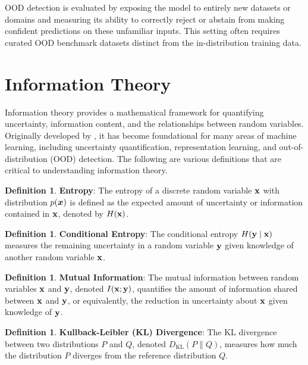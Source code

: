 \documentclass[11pt, oneside]{book}
\theoremstyle{plain}
\theoremstyle{definition}
\newtheorem{definition}[theorem]{Definition}
\theoremstyle{remark}
\begin{document}
OOD detection is evaluated by exposing the model to entirely new datasets or domains and measuring its ability to correctly reject or abstain from making confident predictions on these unfamiliar inputs. This setting often requires curated OOD benchmark datasets distinct from the in-distribution training data.

\section{Information Theory}

Information theory provides a mathematical framework for quantifying uncertainty, information content, and the relationships between random variables. Originally developed by \citet{shannon1948mathematical}, it has become foundational for many areas of machine learning, including uncertainty quantification, representation learning, and out-of-distribution (OOD) detection. The following are various definitions that are critical to understanding information theory.


\begin{definition}
\textbf{Entropy}: The entropy of a discrete random variable ${\mathbf{x}}$ with distribution $p({\bm{x}})$ is defined as the expected amount of uncertainty or information contained in ${\mathbf{x}}$, denoted by $H({\mathbf{x}})$.
\label{def:entropy}
\end{definition}

\begin{definition}
\textbf{Conditional Entropy}: The conditional entropy $H({\mathbf{y}} \mid {\mathbf{x}})$ measures the remaining uncertainty in a random variable ${\mathbf{y}}$ given knowledge of another random variable ${\mathbf{x}}$.
\label{def:conditional_entropy}
\end{definition}

\begin{definition}
\textbf{Mutual Information}: The mutual information between random variables ${\mathbf{x}}$ and ${\mathbf{y}}$, denoted $I({\mathbf{x}}; {\mathbf{y}})$, quantifies the amount of information shared between ${\mathbf{x}}$ and ${\mathbf{y}}$, or equivalently, the reduction in uncertainty about ${\mathbf{x}}$ given knowledge of ${\mathbf{y}}$.
\label{def:mutual_information}
\end{definition}

\begin{definition}
\textbf{Kullback-Leibler (KL) Divergence}: The KL divergence between two distributions $P$ and $Q$, denoted $D_{\mathrm{KL}}(P \parallel Q)$, measures how much the distribution $P$ diverges from the reference distribution $Q$.
\label{def:kl_divergence}
\end{definition}
\end{document}
